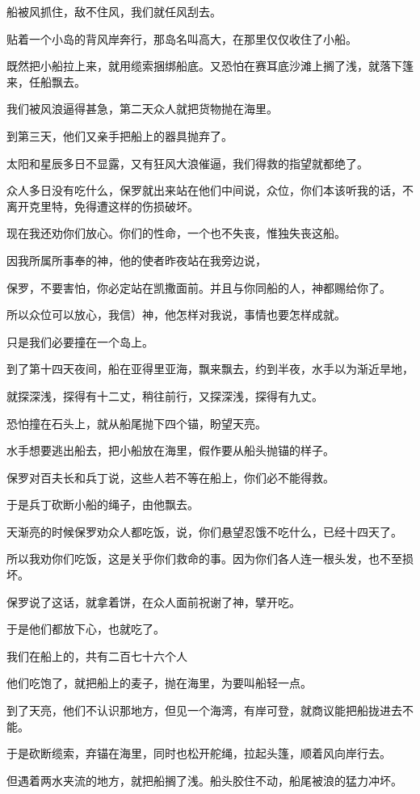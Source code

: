 \documentclass[12pt,oneside]{book}
\begin{document}
船被风抓住，敌不住风，我们就任风刮去。

贴着一个小岛的背风岸奔行，那岛名叫高大，在那里仅仅收住了小船。

既然把小船拉上来，就用缆索捆绑船底。又恐怕在赛耳底沙滩上搁了浅，就落下篷来，任船飘去。

我们被风浪逼得甚急，第二天众人就把货物抛在海里。

到第三天，他们又亲手把船上的器具抛弃了。

太阳和星辰多日不显露，又有狂风大浪催逼，我们得救的指望就都绝了。

众人多日没有吃什么，保罗就出来站在他们中间说，众位，你们本该听我的话，不离开克里特，免得遭这样的伤损破坏。

现在我还劝你们放心。你们的性命，一个也不失丧，惟独失丧这船。

因我所属所事奉的神，他的使者昨夜站在我旁边说，

保罗，不要害怕，你必定站在凯撒面前。并且与你同船的人，神都赐给你了。

所以众位可以放心，我信）神，他怎样对我说，事情也要怎样成就。

只是我们必要撞在一个岛上。

到了第十四天夜间，船在亚得里亚海，飘来飘去，约到半夜，水手以为渐近旱地，

就探深浅，探得有十二丈，稍往前行，又探深浅，探得有九丈。

恐怕撞在石头上，就从船尾抛下四个锚，盼望天亮。

水手想要逃出船去，把小船放在海里，假作要从船头抛锚的样子。

保罗对百夫长和兵丁说，这些人若不等在船上，你们必不能得救。

于是兵丁砍断小船的绳子，由他飘去。

天渐亮的时候保罗劝众人都吃饭，说，你们悬望忍饿不吃什么，已经十四天了。

所以我劝你们吃饭，这是关乎你们救命的事。因为你们各人连一根头发，也不至损坏。

保罗说了这话，就拿着饼，在众人面前祝谢了神，擘开吃。

于是他们都放下心，也就吃了。

我们在船上的，共有二百七十六个人

他们吃饱了，就把船上的麦子，抛在海里，为要叫船轻一点。

到了天亮，他们不认识那地方，但见一个海湾，有岸可登，就商议能把船拢进去不能。

于是砍断缆索，弃锚在海里，同时也松开舵绳，拉起头篷，顺着风向岸行去。

但遇着两水夹流的地方，就把船搁了浅。船头胶住不动，船尾被浪的猛力冲坏。
\end{document}
